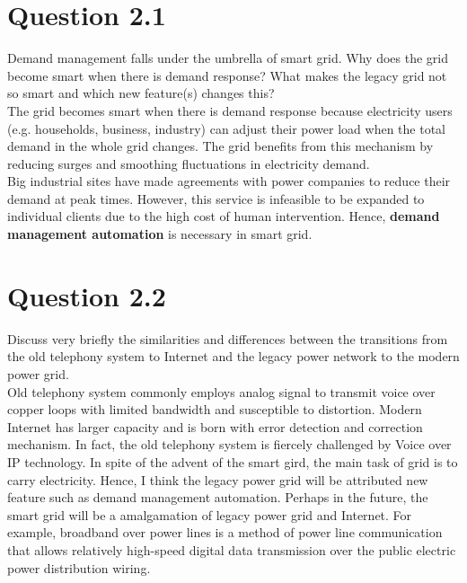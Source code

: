 \documentclass{article}
\newenvironment{homeworkProblem}[1]{
	\section*{#1}
	}{
}
\begin{document}

\begin{homeworkProblem}{Question 2.1}
Demand management falls under the umbrella of smart grid. Why does the grid become smart when there is demand response? What makes the legacy grid not so smart and which new feature(s) changes this?\\

The grid becomes smart when there is demand response because electricity users (e.g. households, business, industry) can adjust their power load when the total demand in the whole grid changes. The grid benefits from this mechanism by reducing surges and smoothing fluctuations in electricity demand.\\

Big industrial sites have made agreements with power companies to reduce their demand at peak times. However, this service is infeasible to be expanded to individual clients due to the high cost of human intervention. Hence, \textbf{demand management automation} is necessary in smart grid.
\end{homeworkProblem}


\begin{homeworkProblem}{Question 2.2}
Discuss very briefly the similarities and differences between the transitions from the old telephony system to Internet and the legacy power network to the modern power grid.\\

Old telephony system commonly employs analog signal to transmit voice over copper loops with limited bandwidth and susceptible to distortion. Modern Internet has larger capacity and is born with error detection and correction mechanism. In fact, the old telephony system is fiercely challenged by Voice over IP technology. In spite of the advent of the smart gird, the main task of grid is to carry electricity. Hence, I think the legacy power grid will be attributed new feature such as demand management automation. Perhaps in the future, the smart grid will be a amalgamation of legacy power grid and Internet. For example, broadband over power lines is a method of power line communication that allows relatively high-speed digital data transmission over the public electric power distribution wiring.
\end{homeworkProblem}
\end{document}
